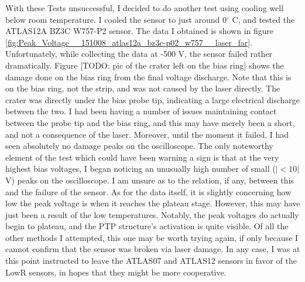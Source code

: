 \documentclass{report}
\begin{document}
            With these Tests unsuccessful, I decided to do another test using cooling well below room temperature. I cooled the sensor to just around 0$^\circ$ C, and tested the ATLAS12A BZ3C W757-P2 sensor. The data I obtained is shown in figure \ref{fig:Peak_Voltage__151008_atlas12a_bz3c-p02_w757__laser_far}. Unfortunately, while collecting the data at -500 V, the sensor failed rather dramatically. Figure [TODO: pic of the crater left on the bias ring] shows the damage done on the bias ring from the final voltage discharge. Note that this is on the bias ring, not the strip, and was not caused by the laser directly. The crater was directly under the bias probe tip, indicating a large electrical discharge between the two. I had been having a number of issues maintaining contact between the probe tip and the bias ring, and this may have merely been a short, and not a consequence of the laser. Moreover, until the moment it failed, I had seen absolutely no damage peaks on the oscilloscope. The only noteworthy element of the test which could have been warning a sign is that at the very highest bias voltages, I began noticing an unusually high number of small ($|< 10|$ V) peaks on the oscilloscope. I am unsure as to the relation, if any, between this and the failure of the sensor. As for the data itself, it is slightly concerning how low the peak voltage is when it reaches the plateau stage. However, this may have just been a result of the low temperatures. Notably, the peak voltages do actually begin to plateau, and the PTP structure's activation is quite visible. Of all the other methods I attempted, this one may be worth trying again, if only because I cannot confirm that the sensor was broken via laser damage. In any case, I was at this point instructed to leave the ATLAS07 and ATLAS12 sensors in favor of the LowR sensors, in hopes that they might be more cooperative.


            
\end{document}
